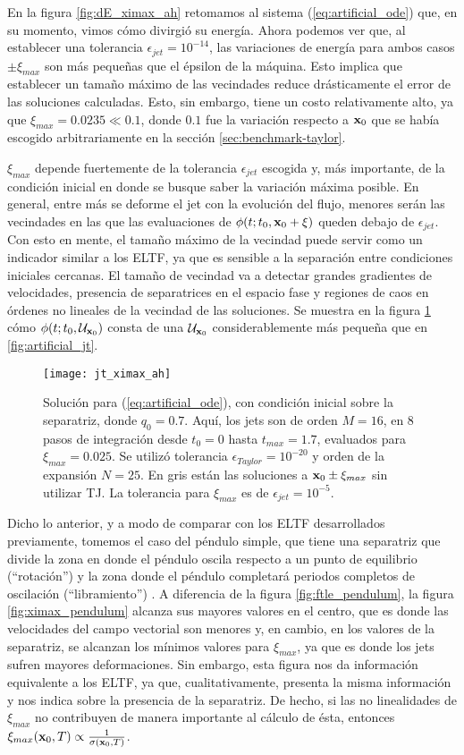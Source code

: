 En la figura \ref{fig:dE_ximax_ah} retomamos al sistema (\ref{eq:artificial_ode}) que, en su momento, vimos cómo divirgió su energía. Ahora podemos ver que, al establecer una tolerancia $\epsilon_{jet} = 10^{-14}$, las variaciones de energía para ambos casos $\pm \xi_{max}$ son más pequeñas que el épsilon de la máquina. Esto implica que establecer un tamaño máximo de las vecindades reduce drásticamente el error de las soluciones calculadas. Esto, sin embargo, tiene un costo relativamente alto, ya que $\xi_{max} = 0.0235 \ll 0.1$, donde $0.1$ fue la variación respecto a $\mathbf{x}_0$ que se había escogido arbitrariamente en la sección \ref{sec:benchmark-taylor}. 

$\xi_{max}$ depende fuertemente de la tolerancia $\epsilon_{jet}$ escogida y, más importante, de la condición inicial en donde se busque saber la variación máxima posible. En general, entre más se deforme el jet con la evolución del flujo, menores serán las vecindades en las que las evaluaciones de $\phi(t;t_0,\mathbf{x}_0 + \xi)$ queden debajo de $\epsilon_{jet}$. Con esto en mente, el tamaño máximo de la vecindad puede servir como un indicador similar a los ELTF, ya que es sensible a la separación entre condiciones iniciales cercanas. El tamaño de vecindad va a detectar grandes gradientes de velocidades, presencia de separatrices en el espacio fase y regiones de caos en órdenes no lineales de la vecindad de las soluciones. Se muestra en la figura \ref{fig:jt_ximax_ah} cómo $\phi(t;t_0,\mathcal{U}_{\mathbf{x}_0} )$ consta de una $\mathcal{U}_{\mathbf{x}_0}$ considerablemente más pequeña que en \ref{fig:artificial_jt}.

\begin{figure}[h!]
 \centering
 \texttt{[image: jt\_ximax\_ah]}
 \caption{Solución para (\ref{eq:artificial_ode}), con condición inicial sobre la separatriz, donde $q_0 = 0.7$. Aquí, los jets son de orden $M=16$, en $8$ pasos de integración desde $t_0 = 0$ hasta $t_{max} = 1.7$, evaluados para $\xi_{max} = 0.025$. Se utilizó tolerancia $\epsilon_{Taylor} = 10^{-20}$ y orden de la expansión $N=25$. En gris están las soluciones a $\mathbf{x}_0 \pm \xi_{max}$ sin utilizar TJ. La tolerancia para $\xi_{max}$ es de $\epsilon_{jet} = 10^{-5}$.}
 \label{fig:jt_ximax_ah}
\end{figure}

Dicho lo anterior, y a modo de comparar con los ELTF desarrollados previamente, tomemos el caso del péndulo simple, que tiene una separatriz que divide la zona en donde el péndulo oscila respecto a un punto de equilibrio (``rotación'') y la zona donde el péndulo completará periodos completos de oscilación (``libramiento'') . A diferencia de la figura \ref{fig:ftle_pendulum}, la figura \ref{fig:ximax_pendulum} alcanza sus mayores valores en el centro, que es donde las velocidades del campo vectorial son menores y, en cambio, en los valores de la separatriz, se alcanzan los mínimos valores para $\xi_{max}$, ya que es donde los jets sufren mayores deformaciones. Sin embargo, esta figura nos da información equivalente a los ELTF, ya que, cualitativamente, presenta la misma información y nos indica sobre la presencia de la separatriz. De hecho, si las no linealidades de $\xi_{max}$ no contribuyen de manera importante al cálculo de ésta, entonces $\xi_{max}(\mathbf{x}_0,T) \propto \frac{1}{\sigma(\mathbf{x}_0,T)}$. 

